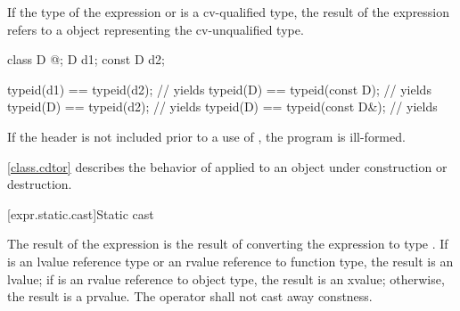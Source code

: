 \pnum
If the type of the expression or  is a
cv-qualified type, the result of the  expression refers
to a  object representing the cv-unqualified
type.
\begin{example}

\begin{codeblock}
class D { @\commentellip@ };
D d1;
const D d2;

typeid(d1) == typeid(d2);       // yields 
typeid(D)  == typeid(const D);  // yields 
typeid(D)  == typeid(d2);       // yields 
typeid(D)  == typeid(const D&); // yields 
\end{codeblock}
\end{example}

\pnum
If the header  is not included prior
to a use of , the program is ill-formed.

\pnum
\begin{note}
\ref{class.cdtor} describes the behavior of  applied to an
object under construction or destruction.
\end{note}

[expr.static.cast]{Static cast}

\pnum
{}%
%
The result of the expression  is the result of
converting the expression  to type .
%
%
If  is an lvalue reference type
or an rvalue reference to function type, the result is an lvalue;
if  is an rvalue reference to object type, the result is an xvalue;
otherwise, the result is a prvalue. The  operator shall not cast
away constness.

